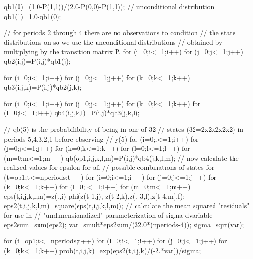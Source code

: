 \documentclass[12pt]{book}
\begin{document}
  qb1(0)=(1.0-P(1,1))/(2.0-P(0,0)-P(1,1)); // unconditional distribution
  qb1(1)=1.0-qb1(0);
  
  // for periods 2 through 4 there are no observations to condition
  // the state distributions on so we use the unconditional distributions
  // obtained by multiplying by the transition matrix P.
  for (i=0;i<=1;i++) {
    for (j=0;j<=1;j++) qb2(i,j)=P(i,j)*qb1(j);  
  }
  
  for (i=0;i<=1;i++) {
    for (j=0;j<=1;j++) {
      for (k=0;k<=1;k++) qb3(i,j,k)=P(i,j)*qb2(j,k); 
    }  
  }
  
  for (i=0;i<=1;i++) {
    for (j=0;j<=1;j++) {
      for (k=0;k<=1;k++) {
        for (l=0;l<=1;l++) qb4(i,j,k,l)=P(i,j)*qb3(j,k,l); 
      }
    }  
  }
  
  // qb(5) is the probabilibility of being in one of 32
  // states (32=2x2x2x2x2) in periods 5,4,3,2,1 before observing
  // y(5)
  for (i=0;i<=1;i++) {
    for (j=0;j<=1;j++) {
      for (k=0;k<=1;k++) {
        for (l=0;l<=1;l++) {
          for (m=0;m<=1;m++) qb(op1,i,j,k,l,m)=P(i,j)*qb4(j,k,l,m); 
        }  
      }
    }  
  }
  // now calculate the realized values for epsilon for all 
  // possible combinations of states
  for (t=op1;t<=nperiods;t++) {
    for (i=0;i<=1;i++) {
      for (j=0;j<=1;j++) {
        for (k=0;k<=1;k++) {
          for (l=0;l<=1;l++) {
            for (m=0;m<=1;m++) {
              eps(t,i,j,k,l,m)=z(t,i)-phi(z(t-1,j),
                z(t-2,k),z(t-3,l),z(t-4,m),f);
              eps2(t,i,j,k,l,m)=square(eps(t,i,j,k,l,m));
            }  
          }
        }
      }                            
    }  
  }  
  // calculate the mean squared "residuals" for use in 
  // "undimensionalized" parameterization of sigma
  dvariable eps2sum=sum(eps2);
  var=smult*eps2sum/(32.0*(nperiods-4)); 
  sigma=sqrt(var);
  
  for (t=op1;t<=nperiods;t++) {
    for (i=0;i<=1;i++) {
      for (j=0;j<=1;j++) {
        for (k=0;k<=1;k++) 
          prob(t,i,j,k)=exp(eps2(t,i,j,k)/(-2.*var))/sigma;
      }                            
    }  
  }  
  
\end{document}
